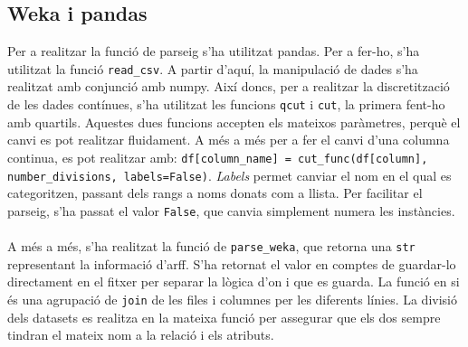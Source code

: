 \subsection{Weka i pandas}
	Per a realitzar la funció de parseig s'ha utilitzat pandas. Per a fer-ho, s'ha utilitzat la funció
	\verb|read_csv|.  A partir d'aquí, la manipulació de dades s'ha realitzat amb conjunció amb 
	numpy. Així doncs, per a realitzar la discretització de les dades contínues, s'ha utilitzat les
	funcions \texttt{qcut} i \texttt{cut}, la primera fent-ho amb quartils. Aquestes dues funcions
	accepten els mateixos paràmetres, perquè el canvi es pot realitzar fluidament. A més a més
	per a fer el canvi d'una columna continua, es pot realitzar amb:
	\verb|df[column_name] = cut_func(df[column], number_divisions, labels=False)|. 
	\textit{Labels} permet canviar el nom en el qual es categoritzen, passant dels rangs a noms
	donats com a llista. Per facilitar el parseig, s'ha passat el valor \texttt{False}, que canvia simplement numera les instàncies. \\
	\\
	A més a més, s'ha realitzat la funció de \verb|parse_weka|, que retorna una \texttt{str} 
	representant la informació d'arff. S'ha retornat el valor en comptes de guardar-lo directament
	en el fitxer per separar la lògica d'on i que es guarda. La funció en si és una agrupació de 
	\texttt{join} de les files i columnes per les diferents línies. La divisió dels datasets es realitza
	en la mateixa funció per assegurar que els dos sempre tindran el mateix nom a la relació i els
	atributs.
